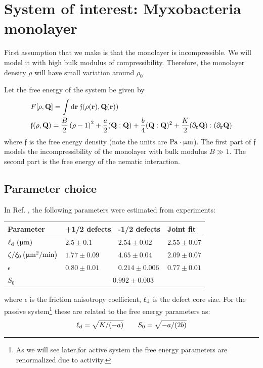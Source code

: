 \documentclass[a5paper]{article}
\begin{document}
\section{System of interest: Myxobacteria monolayer}
First assumption that we make is that the monolayer is incompressible. We will model it with high bulk modulus of compressibility. Therefore, the monolayer density $\rho$ will have small variation around $\rho_0$.


Let the free energy of the system be given by
\begin{align}
    \label{free-energy-choice}
    &F[\rho, \mathbf{Q}] =\int \mathrm{d}\mathbf{r} \;\mathfrak{f}(\rho(\mathbf{r}), \mathbf{Q}(\mathbf{r}))
    \\
    \label{free-energy-choice-2}
    &\mathfrak{f}(\rho,\mathbf{Q})= 
    \frac{B}{2}\left(\rho-1\right)^2 + \frac{a}{2}(\mathbf{Q}:\mathbf{Q}) + \frac{b}{4}(\mathbf{Q}:\mathbf{Q})^2 + \frac{K}{2}(\partial_{\mathbf{r}} \mathbf{Q}):(\partial_{\mathbf{r}} \mathbf{Q})
\end{align}
where $\mathfrak{f}$ is the free energy density (note the units are $\text{Pa} \cdot \upmu\mathrm{m}$).
The first part of $\mathfrak{f}$ models the incompressibility of the monolayer with bulk modulus $B \gg 1$. The second part is the free energy of the nematic interaction.

\subsection{Parameter choice}
\label{sec-parameter-choice}
In Ref. \cite{copenhagen}, the following parameters were estimated from experiments:

\begin{tabular}{|l|l|l|l|}
    \hline Parameter & +1/2 defects & -1/2 defects & Joint fit 
    \\ \hline 
    $\ell_{\rm d}~(\upmu\mathrm{m})$ & $2.5 \pm 0.1$ & $2.54 \pm 0.02$ & $2.55\pm 0.07$ 
    \\ \hline 
    $\zeta / \xi_0\left(\upmu\mathrm{m}^2 / \mathrm{min}\right)$ & $1.77 \pm 0.09$ & $4.65 \pm 0.04$ 
    & $2.09 \pm 0.07$
    \\ \hline 
    $\epsilon$ & $0.80 \pm 0.01$ & $0.214 \pm 0.006$ 
    & $0.77 \pm 0.01$
    \\ \hline
    $S_0$ & \multicolumn{3}{c|}{$0.992\pm 0.003$}
    \\ \hline
\end{tabular}\linebreak
where $\epsilon$ is the friction anisotropy coefficient, $\ell_{\rm d}$ is the defect core size. For the passive system\footnote{As we will see later,for active system the free energy parameters are renormalized due to activity.} these are related to the free energy parameters as:
\begin{align}
    \label{dcsos}
    \ell_{\rm d} = \sqrt{K/(-a)} \qquad S_0 = \sqrt{-a/(2b)}
\end{align}
\end{document}
